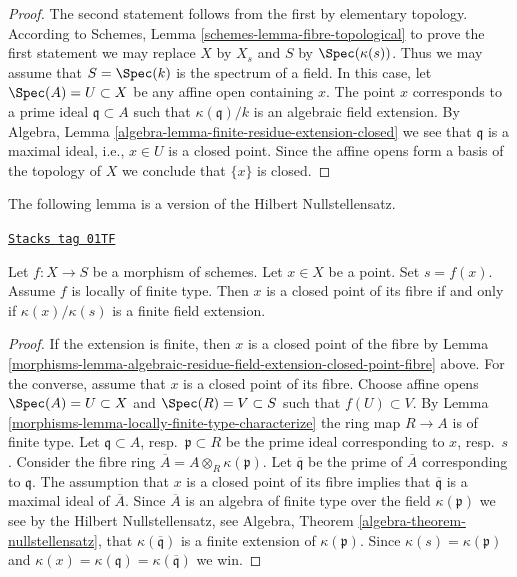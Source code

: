 \begin{proof}
The second statement follows from the first by elementary topology.
According to Schemes, Lemma \ref{schemes-lemma-fibre-topological}
to prove the first statement
we may replace $X$ by $X_s$ and $S$ by $\Spec(\kappa(s))$.
Thus we may assume that $S = \Spec(k)$ is the spectrum of a field.
In this case, let $\Spec(A) = U \subset X$ be any affine open
containing $x$. The point $x$ corresponds to a prime ideal
$\mathfrak q \subset A$ such that $\kappa(\mathfrak q)/k$
is an algebraic field extension. By
Algebra, Lemma \ref{algebra-lemma-finite-residue-extension-closed}
we see that $\mathfrak q$ is a maximal ideal, i.e., $x \in U$ is a
closed point. Since the affine opens form
a basis of the topology of $X$ we conclude that $\{x\}$ is closed.
\end{proof}

The following lemma is a version of the Hilbert Nullstellensatz.

\begin{lemma}
\label{morphisms-lemma-closed-point-fibre-locally-finite-type}
\href{https://stacks.math.columbia.edu/tag/01TF}{\texttt{Stacks tag 01TF}}

Let $f : X \to S$ be a morphism of schemes.
Let $x \in X$ be a point. Set $s = f(x)$.
Assume $f$ is locally of finite type.
Then $x$ is a closed point of its fibre
if and only if $\kappa(x)/\kappa(s)$ is
a finite field extension.
\end{lemma}

\begin{proof}

If the extension is finite, then $x$ is a closed point of
the fibre by
Lemma \ref{morphisms-lemma-algebraic-residue-field-extension-closed-point-fibre}
above. For the converse, assume that $x$ is a closed point
of its fibre. Choose affine opens $\Spec(A) = U \subset X$
and $\Spec(R) = V \subset S$ such that $f(U) \subset V$.
By Lemma \ref{morphisms-lemma-locally-finite-type-characterize} the ring map
$R \to A$ is of finite type. Let $\mathfrak q \subset A$,
resp.\ $\mathfrak p \subset R$ be the prime ideal corresponding
to $x$, resp.\ $s$. Consider the fibre ring
$\overline{A} = A \otimes_R \kappa(\mathfrak p)$.
Let $\overline{\mathfrak q}$ be the prime of $\overline{A}$
corresponding to $\mathfrak q$. The assumption that $x$
is a closed point of its fibre implies that $\overline{\mathfrak q}$
is a maximal ideal of $\overline{A}$. Since $\overline{A}$
is an algebra of finite type over the field $\kappa(\mathfrak p)$
we see by the Hilbert Nullstellensatz, see
Algebra, Theorem \ref{algebra-theorem-nullstellensatz},
that $\kappa(\overline{\mathfrak q})$ is a finite extension
of $\kappa(\mathfrak p)$.
Since $\kappa(s) = \kappa(\mathfrak p)$ and
$\kappa(x) = \kappa(\mathfrak q) = \kappa(\overline{\mathfrak q})$
we win.
\end{proof}

